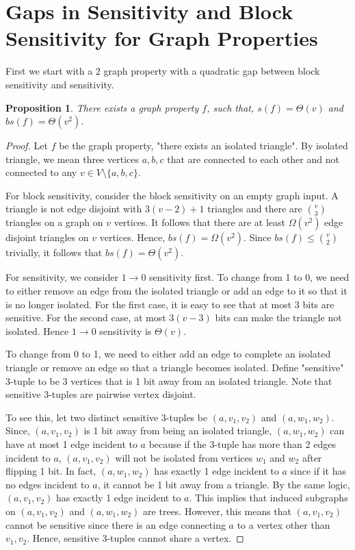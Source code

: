 \documentclass[psamsfonts]{amsart}
\newtheorem{prop}[theorem]{Proposition}
\theoremstyle{definition}
\theoremstyle{remark}
\numberwithin{equation}{section}
\begin{document}
			\section{Gaps in Sensitivity and Block Sensitivity for Graph Properties}
	First we start with a $2$ graph property with a quadratic gap between block sensitivity and sensitivity.

\begin{prop}
There exists a graph property $f$, such that, $s(f) = \Theta(v)$ and $bs(f) = \Theta(v^2)$.
\end{prop} 

\begin{proof}
Let $f$ be the graph property, "there exists an isolated triangle". By isolated triangle, we mean three vertices $a,b,c$ that are connected to each other and not connected to any $v \in V\setminus\{a,b,c\}$.

For block sensitivity, consider the block sensitivity on an empty graph input. A triangle is not edge disjoint with $3(v-2)+1$ triangles and there are ${v \choose 3}$ triangles on a graph on $v$ vertices. It follows that there are at least $\Omega(v^2)$ edge disjoint triangles on $v$ vertices. Hence, $bs(f) = \Omega(v^2)$. Since $bs(f) \leq {v \choose 2}$ trivially, it follows that $bs(f) = \Theta(v^2)$.

For sensitivity, we consider $1 \rightarrow 0$ sensitivity first. To change from 1 to 0, we need to either remove an edge from the isolated triangle or add an edge to it so that it is no longer isolated. For the first case, it is easy to see that at most 3 bits are sensitive. For the second case, at most $3(v-3)$ bits can make the triangle not isolated. Hence $1 \rightarrow 0$ sensitivity is $\Theta(v)$.

To change from 0 to 1, we need to either add an edge to complete an isolated triangle or remove an edge so that a triangle becomes isolated. Define "sensitive" 3-tuple to be 3 vertices that is 1 bit away from an isolated triangle. Note that sensitive 3-tuples are pairwise vertex disjoint. 

To see this, let two distinct sensitive 3-tuples be $(a,v_1,v_2)$ and $(a,w_1,w_2)$. Since, $(a,v_1,v_2)$ is 1 bit away from being an isolated triangle, $(a,w_1,w_2)$ can have at most 1 edge incident to $a$ because if the 3-tuple has more than 2 edges incident to $a$, $(a,v_1,v_2)$ will not be isolated from vertices $w_1$ and $w_2$ after flipping 1 bit. In fact, $(a,w_1,w_2)$ has exactly 1 edge incident to $a$ since if it has no edges incident to $a$, it cannot be 1 bit away from a triangle. By the same logic, $(a,v_1,v_2)$ has exactly 1 edge incident to $a$. This implies that induced subgraphs on $(a,v_1,v_2)$ and $(a,w_1,w_2)$ are trees. However, this means that $(a,v_1,v_2)$ cannot be sensitive since there is an edge connecting $a$ to a vertex other than $v_1,v_2$. Hence, sensitive 3-tuples cannot share a vertex. 


\end{proof}
\end{document}
